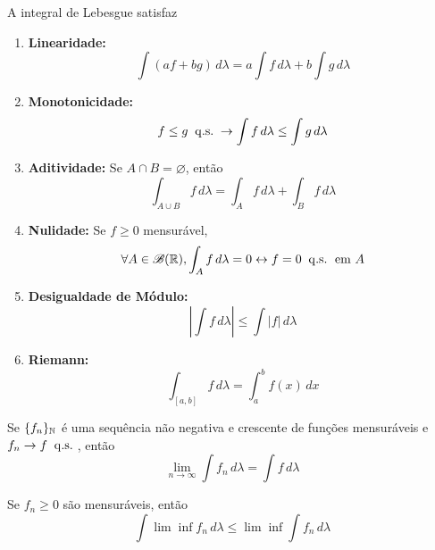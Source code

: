 \begin{thm:integral de lebesgue}
A integral de Lebesgue satisfaz
\begin{enumerate}
	\item[i.] \textbf{Linearidade:}
	      \[
		      \int (a f + b g)\, d \lambda = a \int f\, d \lambda + b \int g\, d\lambda
	      \]
	\item[ii.] \textbf{Monotonicidade:}
	      \[
		      f \le g \;\;\mathrm{q.s.}\; \rightarrow \int f\, d\lambda \le \int g\, d\lambda
	      \]
	\item[iii.] \textbf{Aditividade:} Se $A \cap B = \varnothing$, então
	      \[
		      \int_{A \cup B} f\, d\lambda = \int_A f\, d\lambda + \int_B f\, d\lambda
	      \]
	\item[iv.] \textbf{Nulidade:} Se $f \ge 0$ mensurável,
	      \[
		      \forall A \in \mathcal{B}(\mathbb{R}), \int_A f\, d\lambda = 0 \leftrightarrow f = 0 \;\;\mathrm{q.s.}\; \text{ em } A
	      \]
	\item[v.] \textbf{Desigualdade de Módulo:}
	      \[
		      \left| \int f\, d\lambda\right| \le \int |f|\, d\lambda
	      \]
	\item[vi.] \textbf{Riemann:}
	      \[
		      \int_{[a,b]} f \, d \lambda = \int_a^b f(x)\, dx
	      \]
\end{enumerate}
\end{thm:integral de lebesgue}



\begin{thm:convergencia monotona}
Se $\{f_n\}_{\mathbb{N}}$ é uma sequência não negativa e crescente de funções mensuráveis e
$f_n \to f \;\;\mathrm{q.s.}\;$, então
\[
	\lim_{n \to \infty} \int f_n\, d\lambda = \int f\, d\lambda
\]
\end{thm:convergencia monotona}

\begin{lem:fatou}[de Fatou]
Se $f_n \ge 0$ são mensuráveis, então
\[
	\int \lim \inf f_n\, d\lambda \le \lim \inf \int f_n\, d\lambda
\]
\end{lem:fatou}

